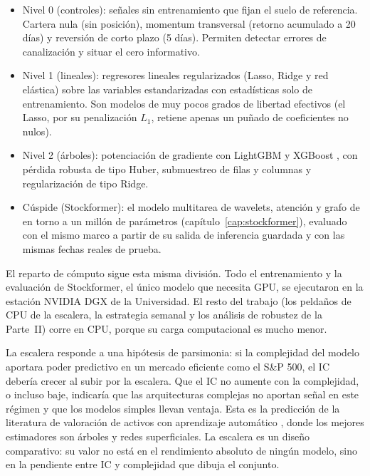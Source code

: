 \begin{itemize}
  \item Nivel 0 (controles): señales sin entrenamiento que fijan el suelo de referencia.
        Cartera nula (sin posición), momentum transversal (retorno acumulado a 20 días) y
        reversión de corto plazo (5 días). Permiten detectar errores de canalización y
        situar el cero informativo.
  \item Nivel 1 (lineales): regresores lineales regularizados (Lasso, Ridge y red
        elástica) sobre las variables estandarizadas con estadísticas solo de
        entrenamiento. Son modelos de muy pocos grados de libertad efectivos (el Lasso,
        por su penalización \(L_1\), retiene apenas un puñado de coeficientes no nulos).
  \item Nivel 2 (árboles): potenciación de gradiente con LightGBM \autocite{ke2017lightgbm}
        y XGBoost \autocite{chen2016xgboost}, con pérdida robusta de tipo Huber,
        submuestreo de filas y columnas y regularización de tipo Ridge.
  \item Cúspide (Stockformer): el modelo multitarea de wavelets, atención y grafo de
        en torno a un millón de parámetros (capítulo~\ref{cap:stockformer}), evaluado con
        el mismo marco a partir de su salida de inferencia guardada y con las mismas
        fechas reales de prueba.
\end{itemize}

El reparto de cómputo sigue esta misma división. Todo el entrenamiento y la evaluación de
Stockformer, el único modelo que necesita GPU, se ejecutaron en la estación NVIDIA DGX de
la Universidad. El resto del trabajo (los peldaños de CPU de la escalera, la estrategia
semanal y los análisis de robustez de la Parte~II) corre en CPU, porque su carga
computacional es mucho menor.

La escalera responde a una hipótesis de parsimonia: si la complejidad del modelo aportara
poder predictivo en un mercado eficiente como el S\&P 500, el IC debería crecer al subir
por la escalera. Que el IC no aumente con la complejidad, o incluso baje, indicaría que
las arquitecturas complejas no aportan señal en este régimen y que los modelos simples
llevan ventaja. Esta es la predicción de la literatura de valoración de activos con
aprendizaje automático \autocite{gu2020empirical}, donde los mejores estimadores son
árboles y redes superficiales. La escalera es un diseño comparativo: su valor no está en
el rendimiento absoluto de ningún modelo, sino en la pendiente entre IC y complejidad que
dibuja el conjunto.

